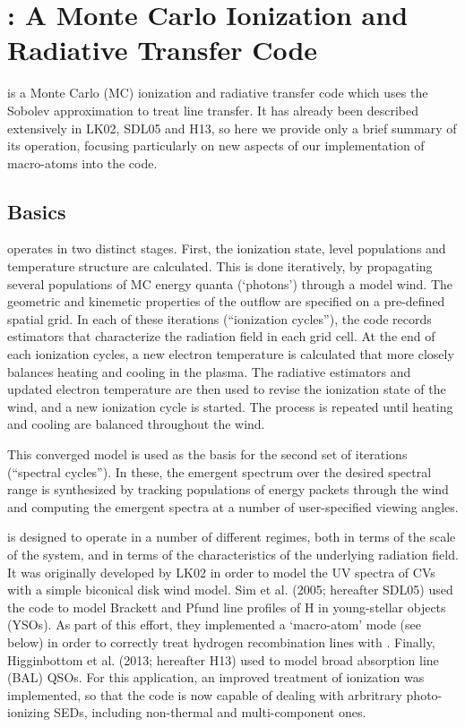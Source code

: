 \documentclass[preprint, a4paper, 11pt]{aastex}
\begin{document}
%
%

\section{: A Monte Carlo Ionization and Radiative Transfer Code}

\py is a Monte Carlo (MC) ionization and radiative transfer code which
uses the Sobolev approximation to treat line transfer. It has already
been described extensively in LK02, SDL05 and H13, so here we provide
only a brief summary of its operation, focusing particularly on new
aspects of our implementation of macro-atoms into the code. 

\subsection{Basics} 

\py operates in two distinct stages. First, the ionization state,
level populations and temperature structure are calculated. This is
done iteratively, by 
propagating several populations of MC energy quanta (`photons')
through a model wind. The geometric and kinemetic properties of the
outflow are specified on a pre-defined spatial grid. In each of these
iterations (``ionization cycles''), the code records estimators that 
characterize the radiation field in each grid cell. At the end 
of each ionization cycles, a new electron temperature is calculated
that more closely balances heating and cooling in the 
plasma. The radiative estimators and updated electron
temperature are then used to revise the ionization state of the wind,
and a new ionization cycle is started. The process is repeated until
heating and cooling are balanced throughout the wind. 

This converged model is used as the basis for the second set of
iterations (``spectral cycles''). In these, the emergent spectrum over
the desired spectral range is synthesized by tracking populations of
energy packets through the wind and computing the emergent spectra at
a number of user-specified viewing angles.  

\py is designed to operate in a number of different
regimes, both in terms of the scale of the system, and in terms of the
characteristics of the underlying radiation field.
It was originally developed by LK02 in order to model the UV spectra
of CVs with a simple biconical disk wind model. Sim et al. (2005;
hereafter SDL05)\nocite{simmacro2005} used the code to model Brackett
and Pfund line profiles of H in young-stellar objects (YSOs). As part
of this effort, they implemented a `macro-atom' mode (see below) in
order to correctly treat hydrogen recombination lines with
\py. Finally, Higginbottom et al.\nocite{higginbottom2013} (2013;
hereafter H13) used \py to model broad absorption line (BAL) QSOs. For
this application, an improved treatment of ionization was implemented,
so that the code is now capable of dealing with arbritrary
photo-ionizing SEDs, including non-thermal and multi-component ones. 
\end{document}
